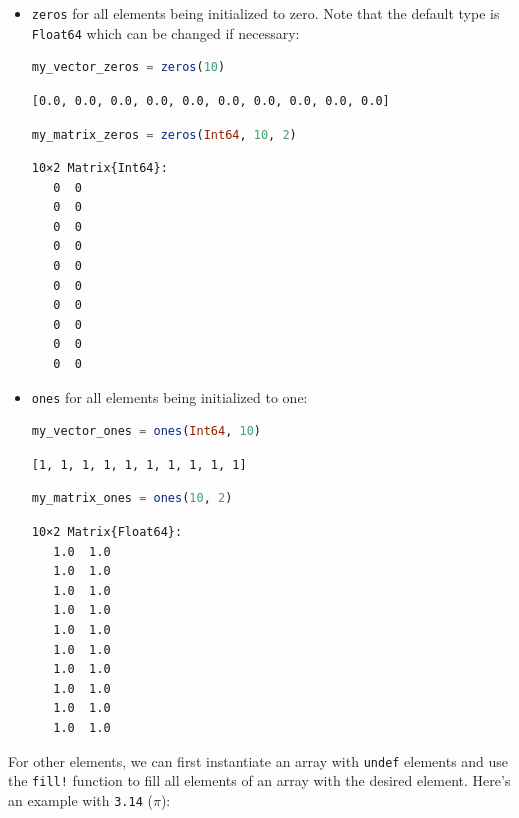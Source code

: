 \documentclass[
  notoc %
]{tufte-book}
\newcommand{\passthrough}[1]{#1}
\begin{document}
\begin{itemize}
\item
  \passthrough{\lstinline!zeros!} for all elements being initialized to
  zero. Note that the default type is \passthrough{\lstinline!Float64!}
  which can be changed if necessary:

  \begin{lstlisting}[language=Julia]
  my_vector_zeros = zeros(10)
  \end{lstlisting}

  \begin{lstlisting}[language=Output]
  [0.0, 0.0, 0.0, 0.0, 0.0, 0.0, 0.0, 0.0, 0.0, 0.0]
  \end{lstlisting}

  \begin{lstlisting}[language=Julia]
  my_matrix_zeros = zeros(Int64, 10, 2)
  \end{lstlisting}

  \begin{lstlisting}[language=Output]
  10×2 Matrix{Int64}:
   0  0
   0  0
   0  0
   0  0
   0  0
   0  0
   0  0
   0  0
   0  0
   0  0
  \end{lstlisting}
\item
  \passthrough{\lstinline!ones!} for all elements being initialized to
  one:

  \begin{lstlisting}[language=Julia]
  my_vector_ones = ones(Int64, 10)
  \end{lstlisting}

  \begin{lstlisting}[language=Output]
  [1, 1, 1, 1, 1, 1, 1, 1, 1, 1]
  \end{lstlisting}

  \begin{lstlisting}[language=Julia]
  my_matrix_ones = ones(10, 2)
  \end{lstlisting}

  \begin{lstlisting}[language=Output]
  10×2 Matrix{Float64}:
   1.0  1.0
   1.0  1.0
   1.0  1.0
   1.0  1.0
   1.0  1.0
   1.0  1.0
   1.0  1.0
   1.0  1.0
   1.0  1.0
   1.0  1.0
  \end{lstlisting}
\end{itemize}

For other elements, we can first instantiate an array with
\passthrough{\lstinline!undef!} elements and use the
\passthrough{\lstinline"fill!"} function to fill all elements of an
array with the desired element. Here's an example with
\passthrough{\lstinline!3.14!} (\(\pi\)):
\end{document}
